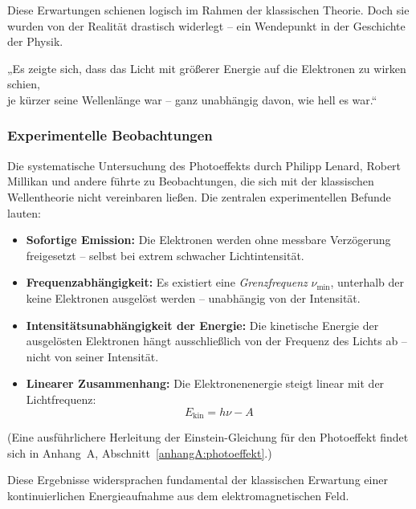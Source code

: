 Diese Erwartungen schienen logisch im Rahmen der klassischen Theorie. Doch sie wurden von der Realität drastisch widerlegt – ein Wendepunkt in der Geschichte der Physik.

\medskip
\begin{tcolorbox}[physikbox, title=Philipp Lenard (1902)\textit{ \cite{lenard1902} }]
	\label{box:Philipp Lenhard}
	\small
	„Es zeigte sich, dass das Licht mit größerer Energie auf die Elektronen zu wirken schien,\\
	je kürzer seine Wellenlänge war – ganz unabhängig davon, wie hell es war.“
\end{tcolorbox}

\subsubsection{Experimentelle Beobachtungen}

Die systematische Untersuchung des Photoeffekts durch Philipp Lenard, Robert Millikan und andere führte zu Beobachtungen, die sich mit der klassischen Wellentheorie nicht vereinbaren ließen. Die zentralen experimentellen Befunde lauten:

\begin{itemize}
	\item \textbf{Sofortige Emission:} Die Elektronen werden ohne messbare Verzögerung freigesetzt – selbst bei extrem schwacher Lichtintensität.
	\item \textbf{Frequenzabhängigkeit:} Es existiert eine \emph{Grenzfrequenz} \( \nu_{\text{min}} \), unterhalb der keine Elektronen ausgelöst werden – unabhängig von der Intensität.
	\item \textbf{Intensitätsunabhängigkeit der Energie:} Die kinetische Energie der ausgelösten Elektronen hängt ausschließlich von der Frequenz des Lichts ab – nicht von seiner Intensität.
	\item \textbf{Linearer Zusammenhang:} Die Elektronenenergie steigt linear mit der Lichtfrequenz:
	\[
	E_{\text{kin}} = h \nu - A
	\]
\end{itemize}
(Eine ausführlichere Herleitung der Einstein-Gleichung für den Photoeffekt findet sich in Anhang~A, Abschnitt~\ref{anhangA:photoeffekt}.)

Diese Ergebnisse widersprachen fundamental der klassischen Erwartung einer kontinuierlichen Energieaufnahme aus dem elektromagnetischen Feld.

